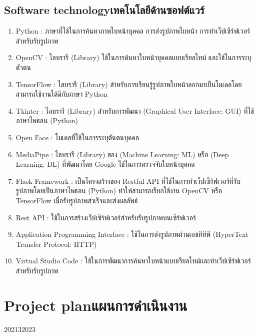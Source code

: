 \subsection{\ifenglish Software technology\else เทคโนโลยีด้านซอฟต์แวร์\fi}
\begin{enumerate}
    \item Python : ภาษาที่ใช้ในการค้นหาภาพใบหน้าบุคคล การส่งรูปภาพใบหน้า การทำเว็ปเซิร์ฟเวอร์สำหรับรับรูปภาพ
    \item OpenCV : ไลบรารี (Library) ใช้ในการค้นหาใบหน้าบุคคลแบบเรียลไทม์ และใช้ในการระบุตัวตน
    \item TensorFlow : ไลบรารี (Library) สำหรับการเรียนรู้รูปภาพใบหน้าออกมาเป็นโมเดลโดยสามารถใช้งานได้ดีกับภาษา Python
    \item Tkinter : ไลบรารี (Library) สำหรับการพัฒนา (Graphical User Interface: GUI) ที่ใช้ภาษาไพธอน (Python)
    \item Open Face : โมเดลที่ใช้ในการระบุตันตนบุคคล
    \item MediaPipe : ไลบรารี (Library) ของ (Machine Learning: ML) หรือ (Deep Learning: DL) ที่พัฒนาโดย Google ใช้ในการตรวจจับใบหน้าบุคคล
    \item Flask Framework : เป็นโครงสร้างของ Restful API ที่ใช้ในการทำเว็ปเซิร์ฟเวอร์ที่รับรูปภาพโดยเป็นภาษาไพธอน (Python) ทำให้สามารถเรียกใช้งาน OpenCV หรือ TensorFlow เมื่อรับรูปภาพสำเร็จและส่งผลลัพธ์
    \item Rest API : ใช้ในการสร้างเว็ปเซิร์ฟเวอร์สำหรับรับรูปภาพบนเซิร์ฟเวอร์
    \item Application Programming Interface : ใช้ในการส่งรูปภาพผ่านเอชทีทีพี (HyperText Transfer Protocol: HTTP)
    \item Virtual Studio Code : ใช้ในการพัฒนาการค้นหาใบหน้าแบบเรียลไทม์และทำเว็ปเซิร์ฟเวอร์สำหรับรับรูปภาพ
    
\end{enumerate}

\section{\ifenglish Project plan\else แผนการดำเนินงาน\fi}

\begin{plan}{12}{2021}{3}{2023}
\end{plan}

